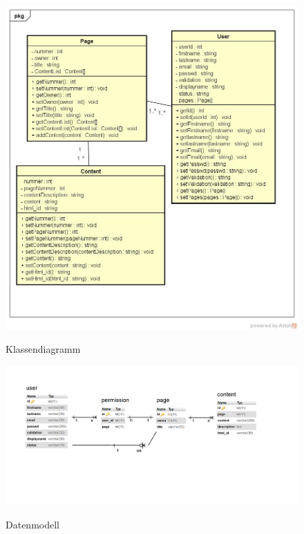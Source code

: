 \documentclass[10pt]{scrarticle}
\begin{document}
\begin{figure}[h]
\caption{Klassendiagramm}
\includegraphics[width=\textwidth]{ClassDiagram}
\label{fig:classdiagram}
\end{figure}

\begin{figure}[h]
\caption{Datenmodell}
\includegraphics[width=\textwidth]{DatenmodellEPortfolio}
\label{fig:datenmodell}
\end{figure}
\end{document}
